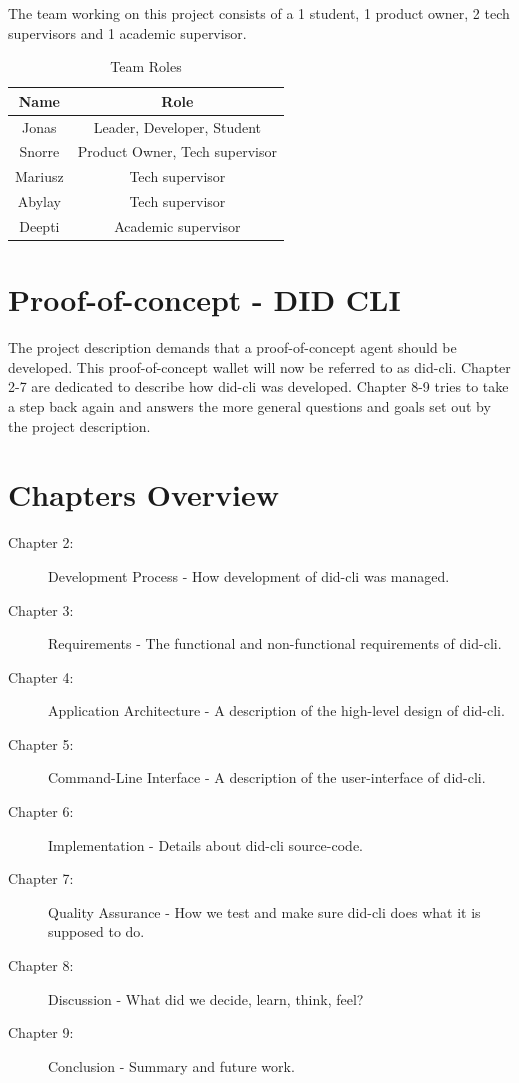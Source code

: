 The team working on this project consists of a 1 student, 1 product owner, 2 tech supervisors and 1 academic supervisor.

\begin{table}
  \centering
  \caption{Team Roles}
  \label{tab:example1}
  \begin{tabular}{cc}
    \hline
    Name  & Role \\
    \hline
    Jonas       & Leader, Developer, Student         \\
    Snorre      & Product Owner, Tech supervisor \\
    Mariusz     & Tech supervisor \\
    Abylay      & Tech supervisor \\
    Deepti      & Academic supervisor \\
    \hline
  \end{tabular}
\end{table}



\newpage

\section{Proof-of-concept - DID CLI}

The project description demands that a proof-of-concept agent should be developed. This proof-of-concept wallet will now be referred to as \acrfull{did-cli}. Chapter 2-7 are dedicated to describe how \acrshort{did-cli} was developed. Chapter 8-9 tries to take a step back again and answers the more general questions and goals set out by the project description.

\section{Chapters Overview}

\begin{description}
    \item[Chapter 2:] Development Process - How development of \acrshort{did-cli} was managed.
    \item[Chapter 3:] Requirements - The functional and non-functional requirements of \acrshort{did-cli}.
    \item[Chapter 4:] Application Architecture - A description of the high-level design of \acrshort{did-cli}.
    \item[Chapter 5:] Command-Line Interface - A description of the user-interface of \acrshort{did-cli}.
    \item[Chapter 6:] Implementation - Details about \acrshort{did-cli} source-code.
    \item[Chapter 7:] Quality Assurance - How we test and make sure \acrshort{did-cli} does what it is supposed to do. 
    \item[Chapter 8:] Discussion - What did we decide, learn, think, feel?
    \item[Chapter 9:] Conclusion - Summary and future work.
\end{description}
